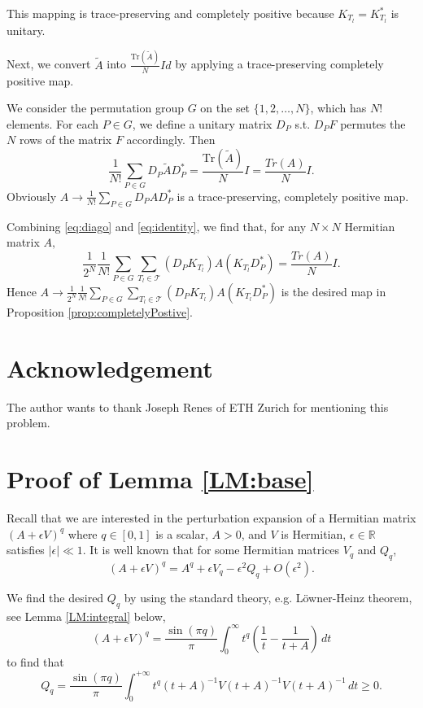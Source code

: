 \documentclass{article}
\numberwithin{equation}{section}
\begin{document}
This mapping is trace-preserving and completely positive because $K_{T_l}=K^{*}_{T_l}$ is unitary.

Next, we convert $\tilde{A}$ into $\frac{\text{Tr}(\tilde{A})}{N} Id$ by applying a trace-preserving completely positive map.

We consider the permutation group $G$ on the set $\{1, 2, \dots, N\}$, which has $N!$ elements. For each $P \in G$, we define a unitary matrix $D_P$ s.t. $D_P F$ permutes the $N$ rows of the matrix $F$ accordingly.
Then
\begin{equation}\label{eq:identity}
\frac{1}{N!} \sum_{P \in G} D_P \tilde{A} D^{*}_P = 
\frac{\text{Tr}(\tilde{A})}{N} I=\frac{Tr(A)}{N} I.
\end{equation}
Obviously $A\rightarrow\frac{1}{N!} \sum_{P \in G} D_P A D^{*}_P$ is a trace-preserving, completely positive map.

Combining \eqref{eq:diago} and \eqref{eq:identity}, we find that, for any $N\times N$ Hermitian matrix $A,$
\[
\frac{1}{2^N} \frac{1}{N!} \sum_{P \in G} \sum_{T_l \in \mathcal{T}} (D_P K_{T_l}) A (K_{T_l} D^{*}_P) = \frac{Tr(A)}{N} I.
\] Hence $A\rightarrow\frac{1}{2^N} \frac{1}{N!} \sum_{P \in G} \sum_{T_l \in \mathcal{T}} (D_P K_{T_l}) A (K_{T_l} D^{*}_P)$ is the desired map in Proposition \ref{prop:completelyPostive}.

\section*{Acknowledgement} The author wants to thank Joseph Renes of ETH Zurich for mentioning this problem.

\appendix


\section{ Proof of Lemma \ref{LM:base} }\label{sec:Base}
Recall that we are interested in the perturbation expansion of a Hermitian matrix
$
(A + \epsilon V)^q
$
where $q\in [0,1]$ is a scalar, $A > 0$, and $V$ is Hermitian, $\epsilon \in \mathbb{R}$ satisfies $|\epsilon| \ll 1$. It is well known that for some Hermitian matrices $V_q$ and $Q_q$,
\begin{equation}\label{eqn:Vp}
    (A + \epsilon V)^q = A^q + \epsilon V_q -\epsilon^2 Q_{q}+O(\epsilon^2).
\end{equation}


We find the desired $Q_q$ by using the standard theory, e.g. L\"owner-Heinz theorem, see Lemma \ref{LM:integral} below,
\begin{equation}\label{eq:Lowner}
(A+\epsilon V)^{q}
= \frac{\sin(\pi q)}{\pi } \int_{0}^{\infty} t^{q} \left( \frac{1}{t} - \frac{1}{t + A} \right)\, dt
\end{equation}
to find that
\begin{equation*}
    Q_q = \frac{\sin(\pi q)}{\pi} \int_{0}^{+\infty} t^{q} (t + A)^{-1} V (t + A)^{-1} V (t + A)^{-1} \, dt\geq 0.
\end{equation*}
\end{document}
